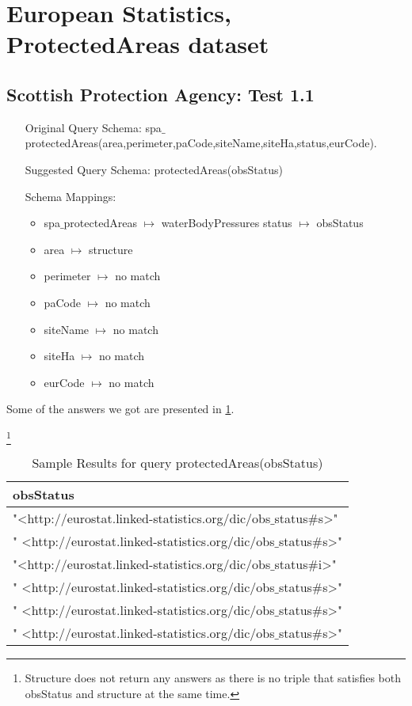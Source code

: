 \documentclass[a4paper,10pt]{article}
\begin{document}
\section{European Statistics, ProtectedAreas dataset}

\subsection{Scottish Protection Agency: Test 1.1}
\label{Section 2: Test 1}

\begin{itemize}
\item[Original Query Schema:] spa$\_$protectedAreas(area,perimeter,paCode,siteName,siteHa,status,eurCode).
\item[Suggested Query Schema: ]
protectedAreas(obsStatus)
\item[Schema Mappings:] 
		\begin{itemize}
		\item spa$\_$protectedAreas $\mapsto$ waterBodyPressures
		status $\mapsto$ obsStatus
\item area $\mapsto$ structure
\item perimeter $\mapsto$ no match
\item paCode $\mapsto$ no match
\item siteName $\mapsto$ no match
\item siteHa $\mapsto$ no match
\item eurCode $\mapsto$ no match

		\end{itemize}
\end{itemize}		
Some of the answers we got are presented in  \ref{protectedAreas(obsStatus)}.
\begin{table}[!tb]

\caption{Sample Results for query protectedAreas(obsStatus)} \footnote{Structure does not return any answers as there is no triple that satisfies both obsStatus and structure at the same time.}
\begin{center}
\begin{tabular}{l}
\hline
obsStatus \\ \hline
"<http://eurostat.linked-statistics.org/dic/obs$\_$status$\#$s>"\\ 
" <http://eurostat.linked-statistics.org/dic/obs$\_$status$\#$s>" \\
"<http://eurostat.linked-statistics.org/dic/obs$\_$status$\#$i>" \\
" <http://eurostat.linked-statistics.org/dic/obs$\_$status$\#$s>" \\
" <http://eurostat.linked-statistics.org/dic/obs$\_$status$\#$s>" \\
" <http://eurostat.linked-statistics.org/dic/obs$\_$status$\#$s>" \\




\end{tabular}
\label{protectedAreas(obsStatus)}
\end{center}

\end{table}
\end{document}
